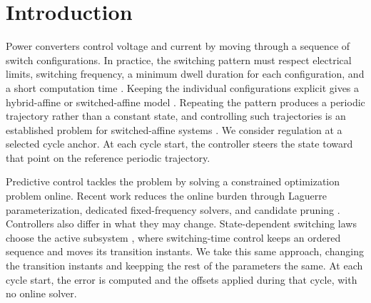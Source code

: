 \documentclass[pdflatex,iicol,sn-mathphys-ay]{sn-jnl}
\begin{document}
\section{Introduction}

Power converters control voltage and current by moving through a sequence of switch configurations. In practice, the switching pattern must respect electrical limits, switching frequency, a minimum dwell duration for each configuration, and a short computation time \cite{karamanakos2020mpcPowerElectronics}. Keeping the individual configurations explicit gives a hybrid-affine or switched-affine model \cite{albea2021hybridAffinePwm}. Repeating the pattern produces a periodic trajectory rather than a constant state, and controlling such trajectories is an established problem for switched-affine systems \cite{egidio2020,xu2024fcsLimitCycle}. We consider regulation at a selected cycle anchor. At each cycle start, the controller steers the state toward that point on the reference periodic trajectory.

Predictive control tackles the problem by solving a constrained optimization problem online. Recent work reduces the online burden through Laguerre parameterization, dedicated fixed-frequency solvers, and candidate pruning \cite{saeed2022laguerre,yang2022fixed,augustine2023mpc}. Controllers also differ in what they may change. State-dependent switching laws choose the active subsystem \cite{egidio2022rank}, where switching-time control keeps an ordered sequence and moves its transition instants. We take this same approach, changing the transition instants and keepping the rest of the parameters the same. At each cycle start, the error is computed and the offsets applied during that cycle, with no online solver.
\end{document}
